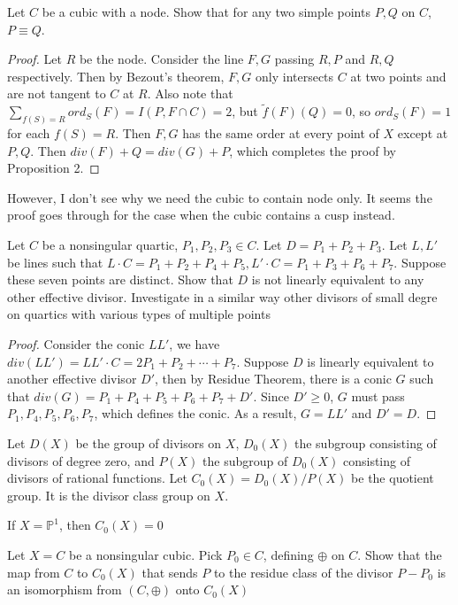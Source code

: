 \documentclass{solution}
\begin{document}
\begin{problem}{8.4}
    Let $C$ be a cubic with a node. Show that for any two simple points $P, Q$ on $C$, $P \equiv Q$.
\end{problem}

\begin{proof}
    Let $R$ be the node. Consider the line $F, G$ passing $R, P$ and $R, Q$ respectively. Then by Bezout's theorem, $F, G$ only intersects $C$ at two points and are not tangent to $C$ at $R$. Also note that $\sum\limits_{f(S) = R} ord_S(F) = I(P, F \cap C) = 2$, but $\tilde{f}(F)(Q) = 0$, so $ord_{S}(F) = 1$ for each $f(S) = R$. Then $F, G$ has the same order at every point of $X$ except at $P, Q$. Then $div(F) + Q = div(G) + P$, which completes the proof by Proposition 2.
\end{proof}

However, I don't see why we need the cubic to contain node only. It seems the proof goes through for the case when the cubic contains a cusp instead.

\begin{problem}{8.5}
    Let $C$ be a nonsingular quartic, $P_1, P_2, P_3 \in C$. Let $D = P_1 + P_2 + P_3$. Let $L, L'$ be lines such that $L \cdot C = P_1 + P_2 + P_4 + P_5, L' \cdot C = P_1 + P_3 + P_6 + P_7$. Suppose these seven points are distinct. Show that $D$ is not linearly equivalent to any other effective divisor. Investigate in a similar way other divisors of small degre on quartics with various types of multiple points
\end{problem}

\begin{proof}
    Consider the conic $LL'$, we have $div(LL') = LL' \cdot C = 2P_1 + P_2 + \cdots + P_7$. Suppose $D$ is linearly equivalent to another effective divisor $D'$, then by Residue Theorem, there is a conic $G$ such that $div(G) = P_1 + P_4 + P_5 + P_6 + P_7 + D'$. Since $D' \ge 0$, $G$ must pass $P_1, P_4, P_5, P_6, P_7$, which defines the conic. As a result, $G = LL'$ and $D' = D$.

\end{proof}

\begin{problem}{8.6}
    Let $D(X)$ be the group of divisors on $X$, $D_0(X)$ the subgroup consisting of divisors of degree zero, and $P(X)$ the subgroup of $D_0(X)$ consisting of divisors of rational functions. Let $C_0(X) = D_0(X) / P(X)$ be the quotient group. It is the divisor class group on $X$. \begin{inparaenum}
        \item If $X = \mathbb{P}^1$, then $C_0(X) = 0$
        \item Let $X = C$ be a nonsingular cubic. Pick $P_0 \in C$, defining $\oplus$ on $C$. Show that the map from $C$ to $C_0(X)$ that sends $P$ to the residue class of the divisor $P - P_0$ is an isomorphism from $(C, \oplus)$ onto $C_0(X)$
    \end{inparaenum}
\end{problem}
\end{document}
